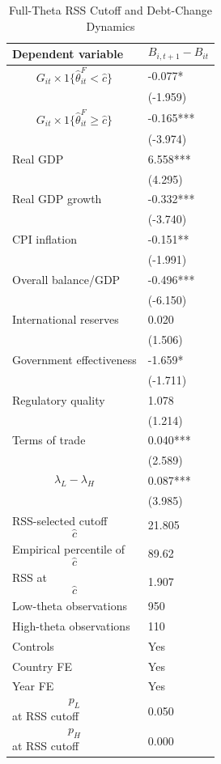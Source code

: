 \begin{table}[H]\centering
\begin{threeparttable}
\caption{Full-Theta RSS Cutoff and Debt-Change Dynamics}
\label{tab:deltaB_rss_cutoff_fulltheta}
\scriptsize
\begin{tabularx}{\textwidth}{lY}
\toprule
Dependent variable & $$B_{i,t+1}-B_{it}$$ \\
\midrule
$$G_{it}\times 1\{\widehat{\theta}^{F}_{it}<\widehat{c}\}$$ & -0.077* \\
 & (-1.959) \\
$$G_{it}\times 1\{\widehat{\theta}^{F}_{it}\geq\widehat{c}\}$$ & -0.165*** \\
 & (-3.974) \\
Real GDP & 6.558*** \\
 & (4.295) \\
Real GDP growth & -0.332*** \\
 & (-3.740) \\
CPI inflation & -0.151** \\
 & (-1.991) \\
Overall balance/GDP & -0.496*** \\
 & (-6.150) \\
International reserves & 0.020 \\
 & (1.506) \\
Government effectiveness & -1.659* \\
 & (-1.711) \\
Regulatory quality & 1.078 \\
 & (1.214) \\
Terms of trade & 0.040*** \\
 & (2.589) \\
$$\lambda_L-\lambda_H$$ & 0.087*** \\
 & (3.985) \\
\midrule
RSS-selected cutoff $$\widehat{c}$$ & 21.805 \\
Empirical percentile of $$\widehat{c}$$ & 89.62 \\
RSS at $$\widehat{c}$$ & 1.907 \\
Low-theta observations & 950 \\
High-theta observations & 110 \\
Controls & Yes \\
Country FE & Yes \\
Year FE & Yes \\
$$p_L$$ at RSS cutoff & 0.050 \\
$$p_H$$ at RSS cutoff & 0.000 \\

\end{tabularx}
\end{threeparttable}
\end{table}
